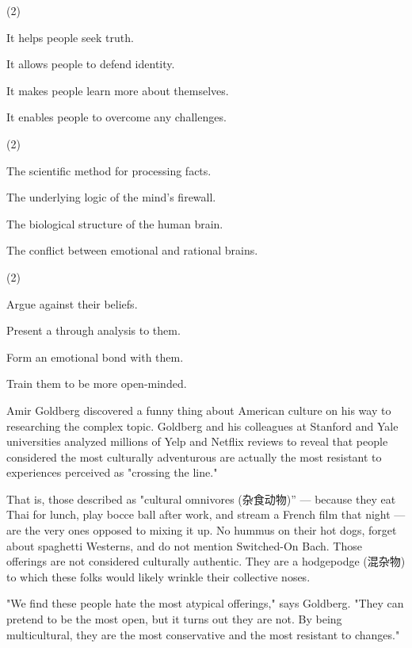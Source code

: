 \documentclass{英语试卷}
\begin{document}
\begin{choices}(2)
  \item It helps people seek truth.
  \item It allows people to defend identity.
  \item It makes people learn more about themselves.
  \item It enables people to overcome any challenges.
\end{choices}
\begin{choices}(2)
  \item The scientific method for processing facts.
  \item The underlying logic of the mind's firewall.
  \item The biological structure of the human brain.
  \item The conflict between emotional and rational brains.
\end{choices}
\begin{choices}(2)
  \item Argue against their beliefs.
  \item Present a through analysis to them.
  \item Form an emotional bond with them.
  \item Train them to be more open-minded.
\end{choices}
\par Amir Goldberg discovered a funny thing about American culture on his way to researching the complex topic. Goldberg and his colleagues at Stanford and Yale universities analyzed millions of Yelp and Netflix reviews to reveal that people considered the most culturally adventurous are actually the most resistant to experiences perceived as "crossing the line."\par
\par That is, those described as "cultural omnivores (杂食动物)” — because they eat Thai for lunch, play bocce ball after work, and stream a French film that night — are the very ones opposed to mixing it up. No hummus on their hot dogs, forget about spaghetti Westerns, and do not mention Switched-On Bach. Those offerings are not considered culturally authentic. They are a hodgepodge (混杂物) to which these folks would likely wrinkle their collective noses.\par
\par "We find these people hate the most atypical offerings," says Goldberg. "They can pretend to be the most open, but it turns out they are not. By being multicultural, they are the most conservative and the most resistant to changes."\par
\end{document}

